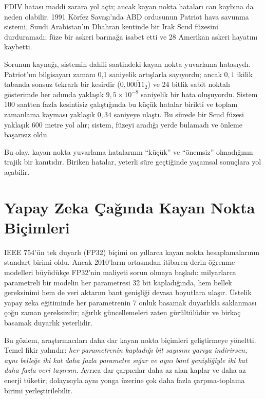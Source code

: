 \begin{bilginot}
FDIV hatası maddi zarara yol açtı; ancak kayan nokta hataları can kaybına da neden olabilir. 1991 Körfez Savaşı'nda ABD ordusunun Patriot hava savunma sistemi, Suudi Arabistan'ın Dhahran kentinde bir Irak Scud füzesini durduramadı; füze bir askeri barınağa isabet etti ve 28 Amerikan askeri hayatını kaybetti.

Sorunun kaynağı, sistemin dahili saatindeki kayan nokta yuvarlama hatasıydı. Patriot'un bilgisayarı zamanı 0{,}1 saniyelik artışlarla sayıyordu; ancak $0{,}1$ ikilik tabanda sonsuz tekrarlı bir kesirdir ($0{,}0\overline{0011}_2$) ve 24 bitlik sabit noktalı gösterimde her adımda yaklaşık $9{,}5 \times 10^{-8}$ saniyelik bir hata oluşuyordu. Sistem 100 saatten fazla kesintisiz çalıştığında bu küçük hatalar birikti ve toplam zamanlama kayması yaklaşık $0{,}34$ saniyeye ulaştı. Bu sürede bir Scud füzesi yaklaşık 600 metre yol alır; sistem, füzeyi aradığı yerde bulamadı ve önleme başarısız oldu.

Bu olay, kayan nokta yuvarlama hatalarının ``küçük'' ve ``önemsiz'' olmadığının trajik bir kanıtıdır. Biriken hatalar, yeterli süre geçtiğinde yaşamsal sonuçlara yol açabilir.
\end{bilginot}

\section{Yapay Zeka Çağında Kayan Nokta Biçimleri}
\label{sec:yapay-zeka-kayan-nokta}

IEEE 754'ün tek duyarlı (FP32) biçimi on yıllarca kayan nokta hesaplamalarının standart birimi oldu. Ancak 2010'ların ortasından itibaren derin öğrenme modelleri büyüdükçe FP32'nin maliyeti sorun olmaya başladı: milyarlarca parametreli bir modelin her parametresi 32 bit kapladığında, hem bellek gereksinimi hem de veri aktarım bant genişliği devasa boyutlara ulaşır. Üstelik yapay zeka eğitiminde her parametrenin 7 onluk basamak duyarlıkla saklanması çoğu zaman gereksizdir; ağırlık güncellemeleri zaten gürültülüdür ve birkaç basamak duyarlık yeterlidir.

Bu gözlem, araştırmacıları daha dar kayan nokta biçimleri geliştirmeye yöneltti. Temel fikir yalındır: \emph{her parametrenin kapladığı bit sayısını yarıya indirirsen, aynı belleğe iki kat daha fazla parametre sığar ve aynı bant genişliğiyle iki kat daha fazla veri taşırsın.} Ayrıca dar çarpıcılar daha az alan kaplar ve daha az enerji tüketir; dolayısıyla aynı yonga üzerine çok daha fazla çarpma-toplama birimi yerleştirilebilir.

